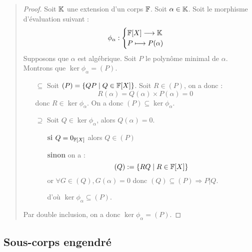 \begin{quote}
    \begin{footnotesize}
        \begin{proof}
            Soit $\mathbb{K}$ une extension d'un corps $\mathbb{F}$. Soit $ \alpha \in \mathbb{K}$. Soit le morphisme d'évaluation suivant : 
                \[ \phi_\alpha : 
                    \begin{cases}
                        \mathbb{F}[X] \longrightarrow \mathbb{K} \\ 
                        P \longmapsto P(\alpha) 
                    \end{cases} \] 
            Supposons que $ \alpha$ est algébrique. Soit $P$ le polynôme minimal de $\alpha$.
            Montrons que $ \ker \phi_\alpha = (P)$. 
            \begin{itemize}
                \item[$\boxed{\subseteq}$] Soit $ (P) = \{QP \; | \; Q \in \mathbb{F}[X]\}$. Soit $R \in (P)$, on a donc : 
                    \[ 
                        R(\alpha) = Q(\alpha) \times P(\alpha) = 0 
                    \] 
                    donc $R \in \ker \phi_\alpha$. On a donc $(P) \subseteq \ker \phi_\alpha$. 
                \item[$\boxed{\supseteq}$] Soit $Q \in \ker \phi_\alpha$, alors $Q(\alpha) = 0$. 
                    \begin{itemize}
                        \item[\textbf{si}] $Q = 0_{\mathbb{F}[X]}$ alors $Q \in (P)$ 
                        \item[ \textbf{sinon}] on a : 
                                \[ (Q) := \{RQ \; | \; R \in \mathbb{F}[X]\} \] 
                            or $ \forall G \in (Q), G(\alpha) = 0$ donc $(Q) \subseteq (P) \Longrightarrow P | Q$. 
                            
                            d'où $ \ker \phi_\alpha \subseteq (P)$. 
                    \end{itemize}
            \end{itemize}
            Par double inclusion, on a donc $\ker \phi_\alpha = (P)$. 
        \end{proof}
    \end{footnotesize}
\end{quote}

\subsection{Sous-corps engendré}

